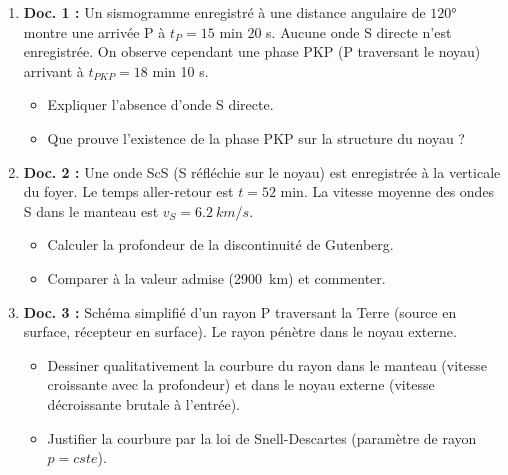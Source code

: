 \documentclass[11pt]{article}
\begin{document}
\begin{exercice}
\begin{enumerate}
\item \textbf{Doc. 1 :} Un sismogramme enregistré à une distance angulaire de $120°$ montre une arrivée P à $t_P = 15$ min 20 s. Aucune onde S directe n'est enregistrée. On observe cependant une phase PKP (P traversant le noyau) arrivant à $t_{PKP} = 18$ min 10 s.
\begin{itemize}
\item[a)] Expliquer l'absence d'onde S directe.
\item[b)] Que prouve l'existence de la phase PKP sur la structure du noyau ?
\end{itemize}
\item \textbf{Doc. 2 :} Une onde ScS (S réfléchie sur le noyau) est enregistrée à la verticale du foyer. Le temps aller-retour est $t = 52$ min. La vitesse moyenne des ondes S dans le manteau est $v_S = \SI{6,2}{km/s}$.
\begin{itemize}
\item[a)] Calculer la profondeur de la discontinuité de Gutenberg.
\item[b)] Comparer à la valeur admise (\SI{2900}{km}) et commenter.
\end{itemize}
\item \textbf{Doc. 3 :} Schéma simplifié d'un rayon P traversant la Terre (source en surface, récepteur en surface). Le rayon pénètre dans le noyau externe.
\begin{itemize}
\item[a)] Dessiner qualitativement la courbure du rayon dans le manteau (vitesse croissante avec la profondeur) et dans le noyau externe (vitesse décroissante brutale à l'entrée).
\item[b)] Justifier la courbure par la loi de Snell-Descartes (paramètre de rayon $p = cste$).
\end{itemize}
\end{enumerate}
\end{exercice}
\end{document}
